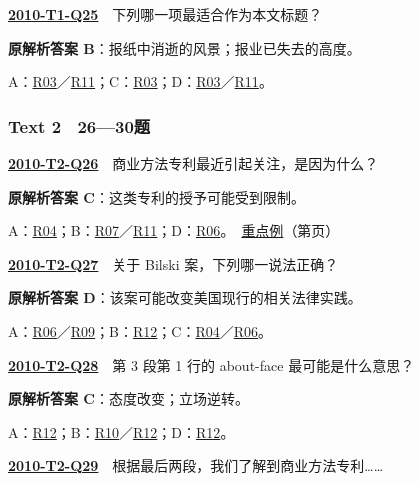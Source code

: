 \documentclass[11pt,a4paper]{article}
\begin{document}
\label{idx-2010-T1-Q25}\noindent\textbf{\href{https://zj139.github.io/math-notes/english/bfa65806b0e493e64d7761c2/\#q25}{2010-T1-Q25}}　下列哪一项最适合作为本文标题？\par\nopagebreak
\noindent\textbf{原解析答案 B}：报纸中消逝的风景；报业已失去的高度。\par\nopagebreak
\noindent A：\hyperref[cat-R03]{R03}／\hyperref[cat-R11]{R11}；C：\hyperref[cat-R03]{R03}；D：\hyperref[cat-R03]{R03}／\hyperref[cat-R11]{R11}。\par\smallskip
{}\subsubsection{Text 2　26—30题}
\label{idx-2010-T2-Q26}\noindent\textbf{\href{https://zj139.github.io/math-notes/english/68417426c052b03f4b409683/\#q26}{2010-T2-Q26}}　商业方法专利最近引起关注，是因为什么？\par\nopagebreak
\noindent\textbf{原解析答案 C}：这类专利的授予可能受到限制。\par\nopagebreak
\noindent A：\hyperref[cat-R04]{R04}；B：\hyperref[cat-R07]{R07}／\hyperref[cat-R11]{R11}；D：\hyperref[cat-R06]{R06}。　\hyperref[case-2010-T2-Q26]{重点例}（第\pageref{case-2010-T2-Q26}页）\par\smallskip
{}\label{idx-2010-T2-Q27}\noindent\textbf{\href{https://zj139.github.io/math-notes/english/68417426c052b03f4b409683/\#q27}{2010-T2-Q27}}　关于 Bilski 案，下列哪一说法正确？\par\nopagebreak
\noindent\textbf{原解析答案 D}：该案可能改变美国现行的相关法律实践。\par\nopagebreak
\noindent A：\hyperref[cat-R06]{R06}／\hyperref[cat-R09]{R09}；B：\hyperref[cat-R12]{R12}；C：\hyperref[cat-R04]{R04}／\hyperref[cat-R06]{R06}。\par\smallskip
{}\label{idx-2010-T2-Q28}\noindent\textbf{\href{https://zj139.github.io/math-notes/english/68417426c052b03f4b409683/\#q28}{2010-T2-Q28}}　第 3 段第 1 行的 about-face 最可能是什么意思？\par\nopagebreak
\noindent\textbf{原解析答案 C}：态度改变；立场逆转。\par\nopagebreak
\noindent A：\hyperref[cat-R12]{R12}；B：\hyperref[cat-R10]{R10}／\hyperref[cat-R12]{R12}；D：\hyperref[cat-R12]{R12}。\par\smallskip
{}\label{idx-2010-T2-Q29}\noindent\textbf{\href{https://zj139.github.io/math-notes/english/68417426c052b03f4b409683/\#q29}{2010-T2-Q29}}　根据最后两段，我们了解到商业方法专利……\par\nopagebreak
\end{document}
